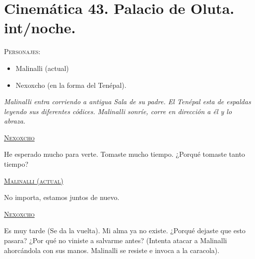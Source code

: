 \documentclass[11pt,letterpaper]{article}
\begin{document}
\section{Cinemática 43. Palacio de Oluta. int/noche. }
 \textsc{Personajes}:
 \begin{itemize}
 \item Malinalli (actual)
\item Nexoxcho (en la forma del Tenépal).
 \end{itemize}
\textit{Malinalli entra corriendo a antigua Sala de su padre. El Tenépal esta de espaldas leyendo sus diferentes códices. Malinalli sonríe, corre en dirección a él y lo abraza. }
\begin{center}
\textsc{\underline{Nexoxcho}}
\\
\par 
He esperado mucho para verte. Tomaste mucho tiempo. ¿Porqué tomaste tanto tiempo?
\\
\par 
\textsc{\underline{Malinalli (actual)}} 
\\
\par 
No importa, estamos juntos de nuevo.
\\
\par 
\textsc{\underline{Nexoxcho}}
\\
\par 
Es muy tarde (Se da la vuelta). Mi alma ya no existe. ¿Porqué dejaste que esto pasara? ¿Por qué no viniste a salvarme antes? (Intenta atacar a Malinalli ahorcándola con sus manos. Malinalli se resiste e invoca a la caracola). 
\end{center}
\end{document}
